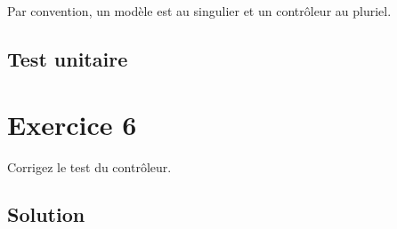 Par convention, un modèle est au singulier et un contrôleur au pluriel.

\hypertarget{test-unitaire-1}{%
\subsection{Test unitaire}\label{test-unitaire-1}}

\begin{otherlanguage}{english}

\begin{Shaded}
\begin{Highlighting}[]

 

\NormalTok{)}
\end{Highlighting}
\end{Shaded}

\end{otherlanguage}

\hypertarget{exercice-6}{%
\section{Exercice 6}\label{exercice-6}}

Corrigez le test du contrôleur.

\begin{otherlanguage}{english}

\begin{Shaded}
\begin{Highlighting}[]
\NormalTok{$ }
\NormalTok{$ }
\NormalTok{$ }

\NormalTok{$ }
\end{Highlighting}
\end{Shaded}

\end{otherlanguage}

\hypertarget{solution-2}{%
\subsection{Solution}\label{solution-2}}

